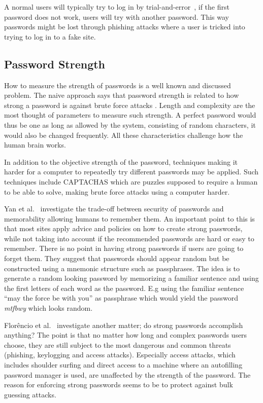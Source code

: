 \par A normal users will typically try to log in by trial-and-error~\cite{single-pw-auth}, if the first password does not work, users will try with another password. This way passwords might be lost through phishing attacks where a user is tricked into trying to log in to a fake site. 

\subsection{Password Strength}\label{password-strength}
How to measure the strength of passwords is a well known and discussed problem. The naive approach says that password strength is related to how strong a password is against brute force attacks \cite{password-strength}. Length and complexity are the most thought of parameters to measure such strength. A perfect password would thus be one as long as allowed by the system, consisting of random characters, it would also be changed frequently. All these characteristics challenge how the human brain works. 
\par In addition to the objective strength of the password, techniques making it harder for a computer to repeatedly try different passwords may be applied. Such techniques include CAPTACHAS \cite{captcha} which are puzzles supposed to require a human to be able to solve, making brute force attacks using a computer harder.
\par Yan et al.~\cite{memorability_yan} investigate the trade-off between security of passwords and memorability allowing humans to remember them. An important point to this is that most sites apply advice and policies on how to create strong passwords, while not taking into account if the recommended passwords are hard or easy to remember. There is no point in having strong passwords if users are going to forget them. They suggest that passwords should appear random but be constructed using a  mnemonic structure such as passphrases. The idea is to generate a random looking password by memorizing a familiar sentence and using the first letters of each word as the password. E.g using the familiar sentence ``may the force be with you'' as passphrase which would yield the password \emph{mtfbwy} which looks random.
\par Florêncio et al.~\cite{strong-pws_florencio} investigate another matter; do strong passwords accomplish anything? The point is that no matter how long and complex passwords users choose, they are still subject to the most dangerous and common threats (phishing, keylogging and access attacks). Especially access attacks, which includes shoulder surfing and direct access to a machine where an autofilling password manager is used, are unaffected by the strength of the password. The reason for enforcing strong passwords seems to be to protect against bulk guessing attacks. 


